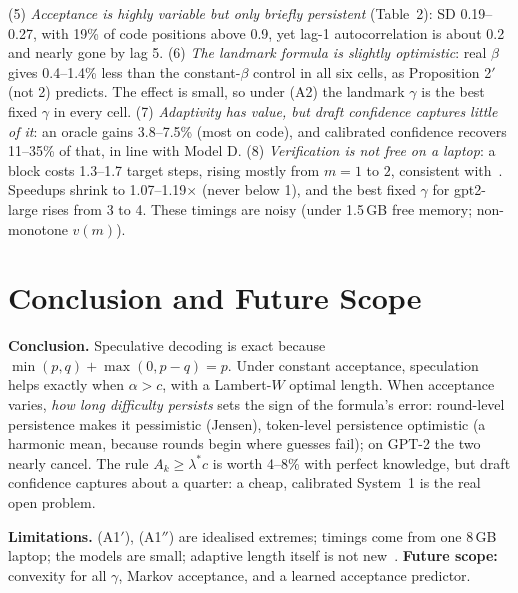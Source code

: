 \documentclass[11pt,letterpaper]{article}
\newcommand{\lstar}{\lambda^{*}}
\begin{document}
(5) \emph{Acceptance is highly variable but only briefly persistent} (Table~2): SD 0.19--0.27, with 19\% of code positions above 0.9, yet lag-1 autocorrelation is about 0.2 and nearly gone by lag 5. (6) \emph{The landmark formula is slightly optimistic}: real $\beta$ gives 0.4--1.4\% less than the constant-$\beta$ control in all six cells, as Proposition 2$'$ (not 2) predicts. The effect is small, so under (A2) the landmark $\gamma$ is the best fixed $\gamma$ in every cell. (7) \emph{Adaptivity has value, but draft confidence captures little of it}: an oracle gains 3.8--7.5\% (most on code), and calibrated confidence recovers 11--35\% of that, in line with Model D. (8) \emph{Verification is not free on a laptop}: a block costs 1.3--1.7 target steps, rising mostly from $m=1$ to $2$, consistent with~\cite{chordiya}. Speedups shrink to 1.07--1.19$\times$ (never below 1), and the best fixed $\gamma$ for gpt2-large rises from 3 to 4. These timings are noisy (under 1.5\,GB free memory; non-monotone $v(m)$).

\section{Conclusion and Future Scope}
\textbf{Conclusion.} Speculative decoding is exact because $\min(p,q)+\max(0,p-q)=p$. Under constant acceptance, speculation helps exactly when $\alpha>c$, with a Lambert-$W$ optimal length. When acceptance varies, \emph{how long difficulty persists} sets the sign of the formula's error: round-level persistence makes it pessimistic (Jensen), token-level persistence optimistic (a harmonic mean, because rounds begin where guesses fail); on GPT-2 the two nearly cancel. The rule $A_k\ge\lstar c$ is worth 4--8\% with perfect knowledge, but draft confidence captures about a quarter: a cheap, calibrated System~1 is the real open problem.

\textbf{Limitations.} (A1$'$), (A1$''$) are idealised extremes; timings come from one 8\,GB laptop; the models are small; adaptive length itself is not new~\cite{disco,specdecpp,l2d}. \textbf{Future scope:} convexity for all $\gamma$, Markov acceptance, and a learned acceptance predictor.
\end{document}
